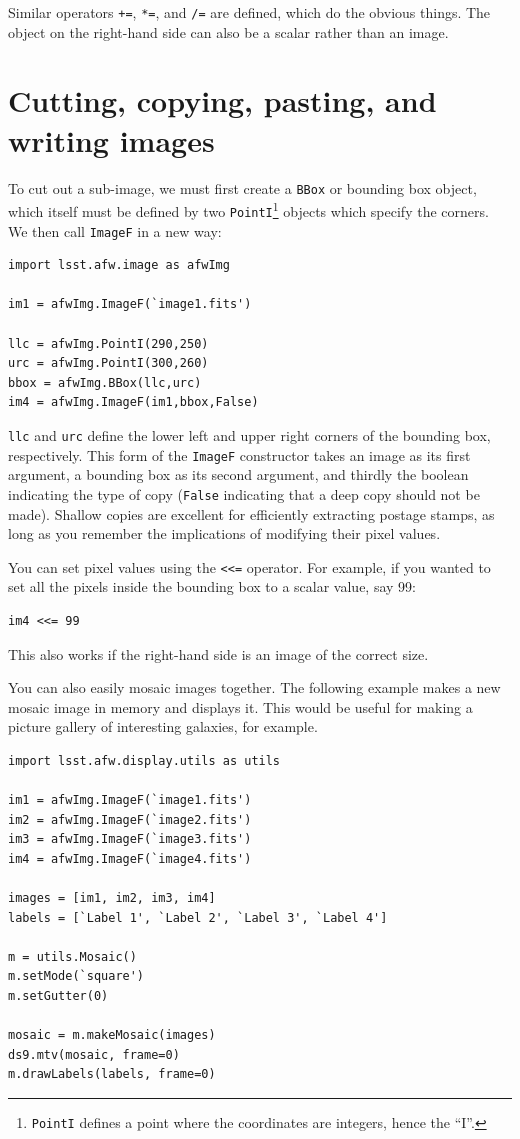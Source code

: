 Similar operators \texttt{+=}, \texttt{*=}, and \texttt{/=} are
defined, which do the obvious things.  The object on the right-hand
side can also be a scalar rather than an image.

\section{Cutting, copying, pasting, and writing images}

To cut out a sub-image, we must first create a \texttt{BBox} or
bounding box object, which itself must be defined by two
\texttt{PointI}\footnote{\texttt{PointI} defines a point where the
 coordinates are integers, hence the ``I''.}  objects which specify
the corners.  We then call \texttt{ImageF} in a new way:

\begin{verbatim}
import lsst.afw.image as afwImg

im1 = afwImg.ImageF(`image1.fits')

llc = afwImg.PointI(290,250)
urc = afwImg.PointI(300,260)
bbox = afwImg.BBox(llc,urc)
im4 = afwImg.ImageF(im1,bbox,False)
\end{verbatim}

\texttt{llc} and \texttt{urc} define the lower left and upper right
corners of the bounding box, respectively.  This form of the
\texttt{ImageF} constructor takes an image as its first argument, a
bounding box as its second argument, and thirdly the boolean
indicating the type of copy (\texttt{False} indicating that a deep
copy should not be made).  Shallow copies are excellent for
efficiently extracting postage stamps, as long as you remember the
implications of modifying their pixel values.

You can set pixel values using the \texttt{<<=} operator.  For
example, if you wanted to set all the pixels inside the bounding box to a
scalar value, say 99:

\begin{verbatim}
im4 <<= 99
\end{verbatim}

This also works if the right-hand side is an image of the correct size.

You can also easily mosaic images together.  The following example
makes a new mosaic image in memory and displays it.  This would be
useful for making a picture gallery of interesting galaxies, for
example.

\begin{verbatim}
import lsst.afw.display.utils as utils

im1 = afwImg.ImageF(`image1.fits')
im2 = afwImg.ImageF(`image2.fits')
im3 = afwImg.ImageF(`image3.fits')
im4 = afwImg.ImageF(`image4.fits')

images = [im1, im2, im3, im4]
labels = [`Label 1', `Label 2', `Label 3', `Label 4']

m = utils.Mosaic()
m.setMode(`square')
m.setGutter(0)

mosaic = m.makeMosaic(images)
ds9.mtv(mosaic, frame=0)
m.drawLabels(labels, frame=0)
\end{verbatim}

